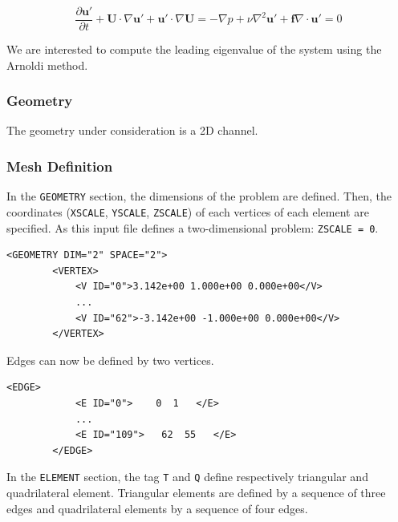   \begin{subequations}
  \begin{equation}
    \frac{\partial \mathbf{u'}}{\partial t} + \mathbf{U} \cdot  \nabla \mathbf{u'}+\mathbf{u'} \cdot \nabla \mathbf{U} = -\nabla p + \nu \nabla^2 \mathbf{u'} + \mathbf{f}
  \end{equation}

  \begin{equation}
  \nabla \cdot \mathbf{u'} = 0
  \end{equation}
  \end{subequations}

  We are interested to compute the leading eigenvalue of the system using the Arnoldi method.

  \subsubsection{Geometry}

   The geometry under consideration is a 2D channel.

   \subsubsection{Mesh Definition}

   In the \texttt{GEOMETRY} section, the dimensions of the problem are defined. Then, the coordinates (\texttt{XSCALE}, \texttt{YSCALE}, \texttt{ZSCALE}) of each vertices of each element are specified. As this input file defines a two-dimensional problem: \texttt{ZSCALE = 0}.

  \begin{lstlisting}[style=XMLStyle]
<GEOMETRY DIM="2" SPACE="2">
        <VERTEX>
            <V ID="0">3.142e+00 1.000e+00 0.000e+00</V>
            ...
            <V ID="62">-3.142e+00 -1.000e+00 0.000e+00</V>
        </VERTEX>
\end{lstlisting}

Edges can now be defined by two vertices.

  \begin{lstlisting}[style=XMLStyle]
<EDGE>
            <E ID="0">    0  1   </E>
            ...
            <E ID="109">   62  55   </E>
        </EDGE>
\end{lstlisting}


In the \texttt{ELEMENT} section, the tag \texttt{T} and \texttt{Q} define respectively triangular and quadrilateral element. Triangular elements are defined by a sequence of three edges and quadrilateral elements by a sequence of four edges.

